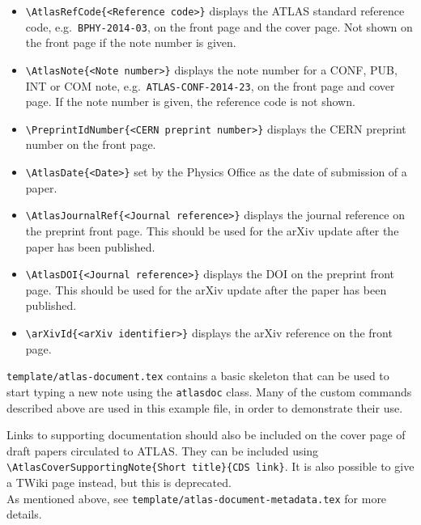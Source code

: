 \begin{itemize}
  \item {\verb|\AtlasRefCode{<Reference code>}|} displays the ATLAS
    standard reference code, e.g.\ \texttt{BPHY-2014-03}, on the front page and
    the cover page. Not shown on the front page if the note number is given.

  \item {\verb|\AtlasNote{<Note number>}|} displays the note number
    for a CONF, PUB, INT or COM note, e.g.\ \texttt{ATLAS-CONF-2014-23},
    on the front page and cover page.
    If the note number is given, the reference code is not shown.

  \item {\verb|\PreprintIdNumber{<CERN preprint number>}|} displays the CERN
    preprint number on the front page.
    
  \item {\verb|\AtlasDate{<Date>}|} set by the Physics Office as the date of submission of a paper.

  \item {\verb|\AtlasJournalRef{<Journal reference>}|} displays the journal reference
    on the preprint front page.
    This should be used for the arXiv update after the paper has been published.

  \item {\verb|\AtlasDOI{<Journal reference>}|} displays the DOI
    on the preprint front page.
    This should be used for the arXiv update after the paper has been published.

  \item {\verb|\arXivId{<arXiv identifier>}|} displays the arXiv reference
    on the front page.

\end{itemize}
%
\texttt{template/atlas-document.tex} contains a basic skeleton that can be
used to start typing a new note using the \texttt{atlasdoc} class. Many of
the custom commands described above are used in this example file, in
order to demonstrate their use.

Links to supporting documentation should also be included on the cover page of draft papers circulated to ATLAS.
They can be included using
\verb|\AtlasCoverSupportingNote{Short title}{CDS link}|.
It is also possible to give a TWiki page instead, but this is deprecated.\\
As mentioned above, see \texttt{template/atlas-document-metadata.tex} for more details.


